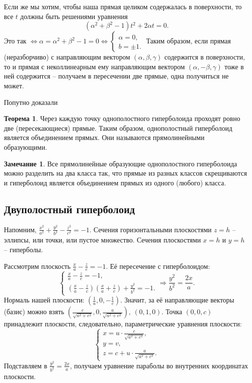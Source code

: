 \documentclass[a4paper, 12pt]{article}
\theoremstyle{definition}
\newtheorem*{theorem}{Теорема}
\newtheorem*{remark}{Замечание}
\begin{document}
Если же мы хотим, чтобы наша прямая целиком содержалась в поверхности, то все $t$ должны быть решениями уравнения
\[(\alpha^2 + \beta^2 - 1)t^2 + 2 \alpha t = 0.\]
Это так $\Leftrightarrow \alpha = \alpha^2 + \beta^2 - 1 = 0 \Leftrightarrow \begin{cases}
    \alpha = 0, \\
    b = \pm 1.
\end{cases}$
Таким образом, если прямая (неразборчиво) с направляющим вектором $(\alpha, \beta, \gamma)$ содержится в поверхности, то и прямая с неколлинеарным ему направляющим вектором $(\alpha, -\beta, \gamma)$ тоже в ней содержится – получаем в пересечении две прямые, одна получиться не может.

Попутно доказали
\begin{theorem}
    Через каждую точку однополостного гиперболоида проходят ровно две (пересекающиеся) прямые. Таким образом, однополостный гиперболоид является объединением прямых. Они называются прямолинейными образующими.
\end{theorem}

\begin{remark}
    Все прямолинейные образующие однополостного гиперболоида можно разделить на два класса так, что прямые из разных классов скрещиваются и гиперболоид является объединением прямых из одного (любого) класса.
\end{remark}


\subsection{Двуполостный гиперболоид}
Напомним, $\frac{x^2}{a^2} + \frac{y^2}{b^2} - \frac{z^2}{c^2} = -1$.
Сечения горизонтальными плоскостями $z = h$ – эллипсы, или точки, или пустое множество.
Сечения плоскостями $x = h$ и $y = h$ – гиперболы.

Рассмотрим плоскость $\frac{x}{a} - \frac{z}{c} = -1$.
Её пересечение с гиперболоидом:
\[\begin{cases}
    \frac{x}{a} - \frac{z}{c} = -1, \\
    \left(\frac{x}{a} - \frac{z}{c}\right) \left(\frac{x}{a} + \frac{z}{c}\right) + \frac{y^2}{b^2} = -1.
\end{cases} \Rightarrow
\frac{y^2}{b^2} = \frac{2x}{a}.\]
Нормаль нашей плоскости: $\left(\frac{1}{a}, 0, -\frac{1}{c}\right)$.
Значит, за её направляющие векторы (базис) можно взять 
$\left(\frac{c}{\sqrt{a^2+c^2}}, 0, \frac{a}{\sqrt{a^2+c^2}}\right), \ (0,1,0)$.
Точка $(0,0,c)$ принадлежит плоскости, следовательно, параметрические уравнения плоскости:
\[\begin{cases}
    x = u \cdot \frac{c}{\sqrt{a^2+c^2}}, \\
    y = v, \\
    z = c + u \cdot \frac{a}{\sqrt{a^2+c^2}}.
\end{cases}\]
Подставляем в $\frac{y^2}{b^2} = \frac{2x}{a}$, получаем уравнение параболы во внутренних координатах плоскости.
\end{document}
